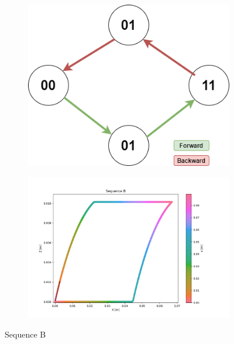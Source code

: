         \begin{figure}[h]
            \begin{subfigure}{.3\textwidth}
            \includegraphics[width=\textwidth]{images/Sequences-Sequence B.png}
            \end{subfigure}%
            \begin{subfigure}{.7\textwidth}
            \includegraphics[width=\textwidth]{images/B.png}
            \end{subfigure}
            \caption{Sequence B}
        \end{figure}
